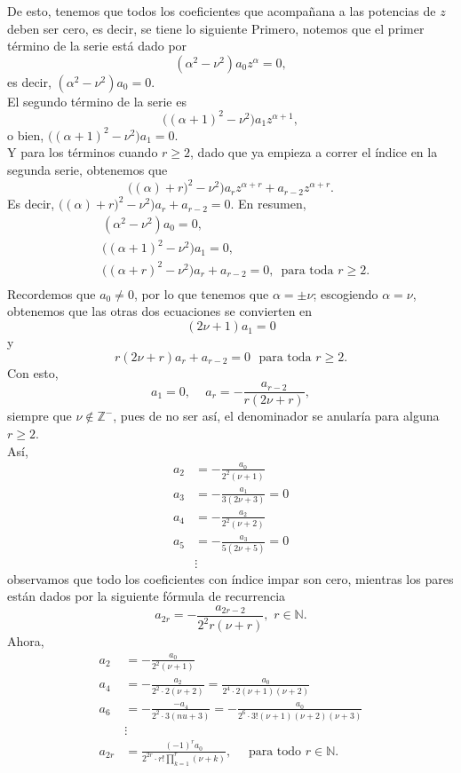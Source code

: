 \documentclass[main.tex]{subfiles}
\begin{document}
De esto, tenemos que todos los coeficientes que acompañana a las potencias de $z$ deben ser cero, es decir, se tiene lo siguiente
Primero, notemos que el primer término de la serie está dado por
\[
  (\alpha^{2}-\nu^{2})a_{0}z^{\alpha}=0,
\]
es decir, $(\alpha^{2}-\nu^{2})a_{0}=0$.\\
El segundo término de la serie es
\[
  \big((\alpha+1)^{2}-\nu^{2}\big)a_{1}z^{\alpha+1},
\]
o bien, $\big((\alpha+1)^{2}-\nu^{2}\big)a_{1}=0$.\\
Y para los términos cuando $r\geq2$, dado que ya empieza a correr el índice en la segunda serie, obtenemos que
\[
  \big((\alpha)+r)^{2}-\nu^{2}\big)a_{r}z^{\alpha+r}+a_{r-2}z^{\alpha+r}.
\]
Es decir, $\big((\alpha)+r)^{2}-\nu^{2}\big)a_{r}+a_{r-2}=0$. En resumen,
\begin{align*}
  &(\alpha^{2}-\nu^{2})a_{0}=0,\\
  &\big((\alpha+1)^{2}-\nu^{2}\big)a_{1}=0,\\
  &\big((\alpha+r)^{2}-\nu^{2}\big)a_{r}+a_{r-2}=0,\,\text{ para toda }r\geq2.\\
\end{align*}
Recordemos que $a_{0}\neq0$, por lo que tenemos que $\alpha=\pm\nu$; escogiendo $\alpha=\nu$, obtenemos que las otras dos ecuaciones se convierten en
\[
  (2\nu+1)a_{1}=0
\]
y
\[
  r(2\nu+r)a_{r}+a_{r-2}=0\,\,\text{ para toda }r\geq2.
\]
Con esto,
\[
  a_{1}=0,\quad\,a_{r}=-\frac{a_{r-2}}{r(2\nu+r)},
\]
siempre que $\nu\notin\mathbb{Z}^{-}$, pues de no ser así, el denominador se anularía para alguna $r\geq2$.\\
Así,
\begin{align*}
  a_{2}&=-\frac{a_{0}}{2^{2}(\nu+1)}\\
  a_{3}&=-\frac{a_{1}}{3(2\nu+3)}=0\\
  a_{4}&=-\frac{a_{2}}{2^{2}(\nu+2)}\\
  a_{5}&=-\frac{a_{3}}{5(2\nu+5)}=0\\
       &\vdots
\end{align*}
observamos que todo los coeficientes con índice impar son cero, mientras los pares están dados por la siguiente fórmula de recurrencia
\[
  a_{2r}=-\frac{a_{2r-2}}{2^{2}r(\nu+r)},\,\,r\in\mathbb{N}.
\]
Ahora,
\begin{align*}
  a_{2}&=-\frac{a_{0}}{2^{2}(\nu+1)}\\
  a_{4}&=-\frac{a_{2}}{2^{2}\cdotp 2(\nu+2)}=\frac{a_{0}}{2^{4}\cdotp 2(\nu+1)(\nu+2)}\\
  a_{6}&=-\frac{-a_{4}}{2^{2}\cdotp 3(nu+3)}=-\frac{a_{0}}{2^{6}\cdotp 3!(\nu+1)(\nu+2)(\nu+3)}\\
       &\vdots\\
  a_{2r}&=\frac{(-1)^{r}a_{0}}{2^{2r}\cdotp r!\prod_{k=1}^{r}(\nu+k)},\quad\text{ para todo }r\in\mathbb{N}.
\end{align*}
\end{document}
